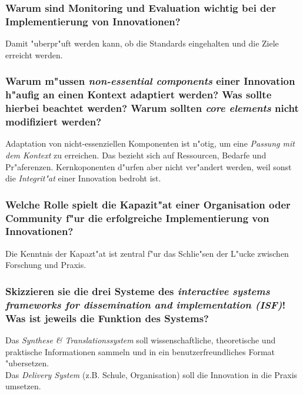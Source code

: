 \subsubsection{Warum sind Monitoring und Evaluation wichtig bei der Implementierung von Innovationen?}
Damit "uberpr"uft werden kann, ob die Standards eingehalten und die Ziele erreicht werden.

\subsubsection{Warum m"ussen \emph{non-essential components} einer Innovation h"aufig an einen Kontext adaptiert werden? Was sollte hierbei beachtet werden? Warum sollten \emph{core elements} nicht modifiziert werden?}
Adaptation von nicht-essenziellen Komponenten ist n"otig, um eine \emph{Passung mit dem Kontext} zu erreichen. Das bezieht sich auf Ressourcen, Bedarfe und Pr"aferenzen. Kernkoponenten d"urfen aber nicht ver"andert werden, weil sonst die \emph{Integrit"at} einer Innovation bedroht ist.

\subsubsection{Welche Rolle spielt die Kapazit"at einer Organisation oder Community f"ur die erfolgreiche Implementierung von Innovationen?}
Die Kenntnis der Kapazt"at ist zentral f"ur das Schlie"sen der L"ucke zwischen Forschung und Praxis. 

\subsubsection{Skizzieren sie die drei Systeme des \emph{interactive systems frameworks for dissemination and implementation (ISF)}! Was ist jeweils die Funktion des Systems?}
Das \emph{Synthese \& Translationssystem} soll wissenschaftliche, theoretische und praktische Informationen sammeln und in ein benutzerfreundliches Format "ubersetzen.\\

\noindent Das \emph{Delivery System} (z.B. Schule, Organisation) soll die Innovation in die Praxis umsetzen.\\

